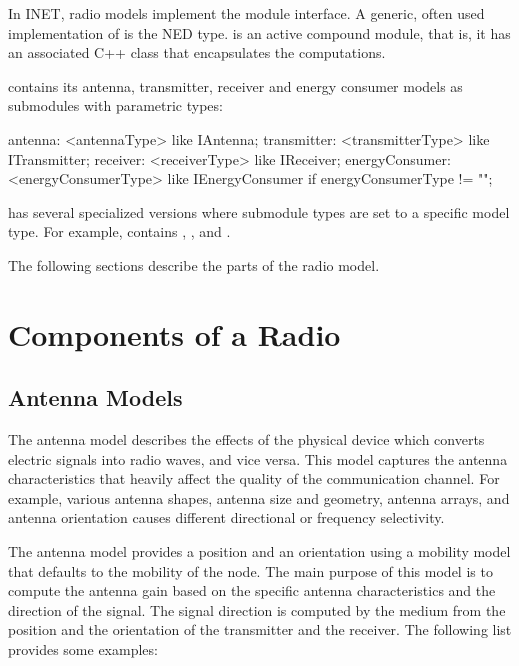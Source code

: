 In INET, radio models implement the  module interface. 
A generic, often used implementation of  is the 
 NED type.  is an active compound module, 
that is, it has an associated C++ class that encapsulates the computations.

 contains its antenna, transmitter, receiver and energy
consumer models as submodules with parametric types:

\begin{ned}
antenna: <antennaType> like IAntenna;
transmitter: <transmitterType> like ITransmitter;
receiver: <receiverType> like IReceiver;
energyConsumer: <energyConsumerType> like IEnergyConsumer 
    if energyConsumerType != "";
\end{ned}

 has several specialized versions where submodule types
are set to a specific model type. For example,  
contains , ,
and . 

The following sections describe the parts of the radio model.

\section{Components of a Radio}

\subsection{Antenna Models}

The antenna model describes the effects of the physical device which converts
electric signals into radio waves, and vice versa. This model captures the
antenna characteristics that heavily affect the quality of the communication
channel. For example, various antenna shapes, antenna size and geometry, antenna
arrays, and antenna orientation causes different directional or frequency
selectivity.

The antenna model provides a position and an orientation using a mobility model
that defaults to the mobility of the node. The main purpose of this model is to
compute the antenna gain based on the specific antenna characteristics and the
direction of the signal. The signal direction is computed by the medium from the
position and the orientation of the transmitter and the receiver. The following
list provides some examples:

